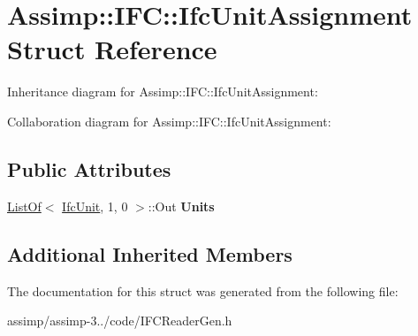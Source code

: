 \hypertarget{struct_assimp_1_1_i_f_c_1_1_ifc_unit_assignment}{\section{Assimp\+:\+:I\+F\+C\+:\+:Ifc\+Unit\+Assignment Struct Reference}
\label{struct_assimp_1_1_i_f_c_1_1_ifc_unit_assignment}
}


Inheritance diagram for Assimp\+:\+:I\+F\+C\+:\+:Ifc\+Unit\+Assignment\+:


Collaboration diagram for Assimp\+:\+:I\+F\+C\+:\+:Ifc\+Unit\+Assignment\+:
\subsection*{Public Attributes}
\begin{DoxyCompactItemize}
\item 
\hypertarget{struct_assimp_1_1_i_f_c_1_1_ifc_unit_assignment_adb06939b8bd826d051908369a7e18fbc}{\hyperlink{struct_assimp_1_1_s_t_e_p_1_1_list_of}{List\+Of}$<$ \hyperlink{class_assimp_1_1_s_t_e_p_1_1_e_x_p_r_e_s_s_1_1_data_type}{Ifc\+Unit}, 1, 0 $>$\+::Out {\bfseries Units}}\label{struct_assimp_1_1_i_f_c_1_1_ifc_unit_assignment_adb06939b8bd826d051908369a7e18fbc}

\end{DoxyCompactItemize}
\subsection*{Additional Inherited Members}


The documentation for this struct was generated from the following file\+:\begin{DoxyCompactItemize}
\item 
assimp/assimp-\/3../code/I\+F\+C\+Reader\+Gen.\+h\end{DoxyCompactItemize}
